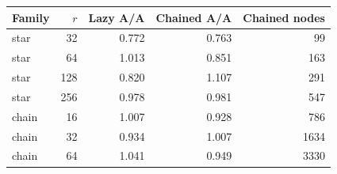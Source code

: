 \begin{tabular}{lrrrr}
\toprule
Family & $r$ & Lazy A/A & Chained A/A & Chained nodes \\
\midrule
star & 32 & 0.772 & 0.763 & 99 \\
star & 64 & 1.013 & 0.851 & 163 \\
star & 128 & 0.820 & 1.107 & 291 \\
star & 256 & 0.978 & 0.981 & 547 \\
chain & 16 & 1.007 & 0.928 & 786 \\
chain & 32 & 0.934 & 1.007 & 1634 \\
chain & 64 & 1.041 & 0.949 & 3330 \\
\bottomrule
\end{tabular}
